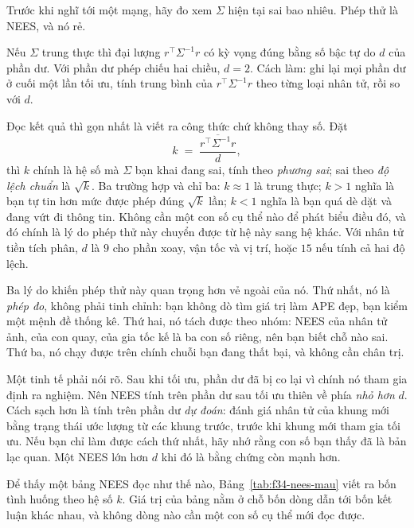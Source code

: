 \documentclass[../../deep_learning.tex]{subfiles}
\begin{document}
Trước khi nghĩ tới một mạng, hãy đo xem \(\Sigma\) hiện tại sai bao nhiêu. Phép thử là NEES, và nó rẻ.

Nếu \(\Sigma\) trung thực thì đại lượng \(r^{\top}\Sigma^{-1}r\) có kỳ vọng đúng bằng số bậc tự do \(d\) của phần dư. Với phần dư phép chiếu hai chiều, \(d = 2\). Cách làm: ghi lại mọi phần dư ở cuối một lần tối ưu, tính trung bình của \(r^{\top}\Sigma^{-1}r\) theo từng loại nhân tử, rồi so với \(d\).

Đọc kết quả thì gọn nhất là viết ra công thức chứ không thay số. Đặt
\[
k \;=\; \frac{\overline{r^{\top}\Sigma^{-1}r}}{d},
\]
thì \(k\) chính là hệ số mà \(\Sigma\) bạn khai đang sai, tính theo \emph{phương sai}; sai theo \emph{độ lệch chuẩn} là \(\sqrt{k}\). Ba trường hợp và chỉ ba: \(k \approx 1\) là trung thực; \(k > 1\) nghĩa là bạn tự tin hơn mức được phép đúng \(\sqrt{k}\) lần; \(k < 1\) nghĩa là bạn quá dè dặt và đang vứt đi thông tin. Không cần một con số cụ thể nào để phát biểu điều đó, và đó chính là lý do phép thử này chuyển được từ hệ này sang hệ khác. Với nhân tử tiền tích phân, \(d\) là \(9\) cho phần xoay, vận tốc và vị trí, hoặc \(15\) nếu tính cả hai độ lệch.

Ba lý do khiến phép thử này quan trọng hơn vẻ ngoài của nó. Thứ nhất, nó là \emph{phép đo}, không phải tinh chỉnh: bạn không dò tìm giá trị làm APE đẹp, bạn kiểm một mệnh đề thống kê. Thứ hai, nó tách được theo nhóm: NEES của nhân tử ảnh, của con quay, của gia tốc kế là ba con số riêng, nên bạn biết chỗ nào sai. Thứ ba, nó chạy được trên chính chuỗi bạn đang thất bại, và không cần chân trị.

Một tinh tế phải nói rõ. Sau khi tối ưu, phần dư đã bị co lại vì chính nó tham gia định ra nghiệm. Nên NEES tính trên phần dư sau tối ưu thiên về phía \emph{nhỏ hơn} \(d\). Cách sạch hơn là tính trên phần dư \emph{dự đoán}: đánh giá nhân tử của khung mới bằng trạng thái ước lượng từ các khung trước, trước khi khung mới tham gia tối ưu. Nếu bạn chỉ làm được cách thứ nhất, hãy nhớ rằng con số bạn thấy đã là bản lạc quan. Một NEES lớn hơn \(d\) khi đó là bằng chứng còn mạnh hơn.

Để thấy một bảng NEES đọc như thế nào, Bảng~\ref{tab:f34-nees-mau} viết ra bốn tình huống theo hệ số \(k\). Giá trị của bảng nằm ở chỗ bốn dòng dẫn tới bốn kết luận khác nhau, và không dòng nào cần một con số cụ thể mới đọc được.
\end{document}
